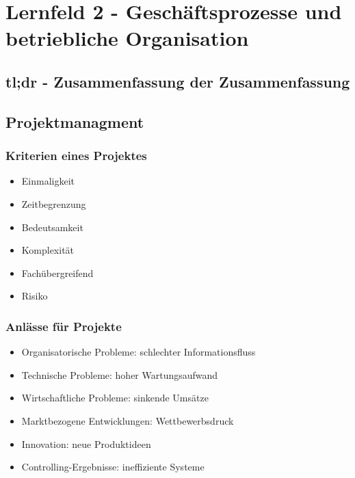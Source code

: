 \section{Lernfeld 2 - Geschäftsprozesse und betriebliche Organisation}

\subsection{tl;dr - Zusammenfassung der Zusammenfassung}

\subsection{Projektmanagment}

\subsubsection{Kriterien eines Projektes}
\begin{itemize}
	\item Einmaligkeit
	\item Zeitbegrenzung
	\item Bedeutsamkeit
	\item Komplexität
	\item Fachübergreifend
	\item Risiko
\end{itemize}

\subsubsection{Anlässe für Projekte}
\begin{itemize}
	\item Organisatorische Probleme: schlechter Informationsfluss
	\item Technische Probleme: hoher Wartungsaufwand
	\item Wirtschaftliche Probleme: sinkende Umsätze
	\item Marktbezogene Entwicklungen: Wettbewerbsdruck
	\item Innovation: neue Produktideen
	\item Controlling-Ergebnisse: ineffiziente Systeme
\end{itemize}

